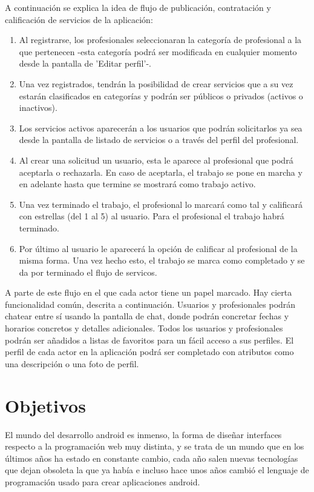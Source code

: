 A continuación se explica la idea de flujo de publicación, contratación y calificación de servicios de la aplicación:
\begin{enumerate}
	\item Al registrarse, los profesionales seleccionaran la categoría de profesional a la que pertenecen -esta categoría podrá ser modificada en cualquier momento desde la pantalla de 'Editar perfil'-.
	\item Una vez registrados, tendrán la posibilidad de crear servicios que a su vez estarán clasificados en categorías y podrán ser públicos o privados (activos o inactivos).
	\item Los servicios activos aparecerán a los usuarios que podrán solicitarlos ya sea desde la pantalla de listado de servicios o a través del perfil del profesional.
	\item Al crear una solicitud un usuario, esta le aparece al profesional que podrá aceptarla o rechazarla. En caso de aceptarla, el trabajo se pone en marcha y en adelante hasta que termine se mostrará como trabajo activo.
	\item Una vez terminado el trabajo, el profesional lo marcará como tal y calificará con estrellas (del 1 al 5) al usuario. Para el profesional el trabajo habrá terminado.
	\item Por último al usuario le aparecerá la opción de calificar al profesional de la misma forma. Una vez hecho esto, el trabajo se marca como completado y se da por terminado el flujo de servicos.
\end{enumerate}
A parte de este flujo en el que cada actor tiene un papel marcado. Hay cierta funcionalidad común, descrita a continuación. Usuarios y profesionales podrán chatear entre sí usando la pantalla de chat, donde podrán concretar fechas y horarios concretos y detalles adicionales. Todos los usuarios y profesionales podrán ser añadidos a listas de favoritos para un fácil acceso a sus perfiles. El perfil de cada actor en la aplicación podrá ser completado con atributos como una descripción o una foto de perfil.

\section{Objetivos}
El mundo del desarrollo android es inmenso, la forma de diseñar interfaces respecto a la programación web muy distinta, y se trata de un mundo que en los últimos años ha estado en constante cambio, cada año salen nuevas tecnologías que dejan obsoleta la que ya había e incluso hace unos años cambió el lenguaje de programación usado para crear aplicaciones android.


